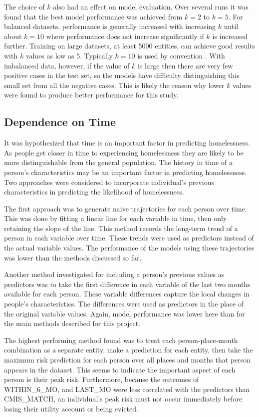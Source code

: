 \documentclass[10pt,letterpaper]{article}
\begin{document}
The choice of $k$ also had an effect on model evaluation. Over several runs it was found that the best model performance was achieved from $k=2$ to $k=5$. For balanced datasets, performance is generally increased with increasing $k$ until about $k=10$ where performance does not increase significantly if $k$ is increased further. Training on large datasets, at least 5000 entities, can achieve good results with $k$ values as low as 5. Typically $k=10$ is used by convention \cite{marcot2020optimal}. With imbalanced data, however, if the value of $k$ is large then there are very few positive cases in the test set, so the models have difficulty distinguishing this small set from all the negative cases. This is likely the reason why lower $k$ values were found to produce better performance for this study.

\subsection*{Dependence on Time}
It was hypothesized that time is an important factor in predicting homelessness. As people get closer in time to experiencing homelessness they are likely to be more distinguishable from the general population. The history in time of a person's characteristics may be an important factor in predicting homelessness. Two approaches were considered to incorporate individual's previous characteristics in predicting the likelihood of homelessness.

The first approach was to generate naive trajectories for each person over time. This was done by fitting a linear line for each variable in time, then only retaining the slope of the line. This method records the long-term trend of a person in each variable over time. These trends were used as predictors instead of the actual variable values. The performance of the models using these trajectories was lower than the methods discussed so far.

Another method investigated for including a person's previous values as predictors was to take the first difference in each variable of the last two months available for each person. These variable differences capture the local changes in people's characteristics. The differences were used as predictors in the place of the original variable values. Again, model performance was lower here than for the main methods described for this project.

The highest performing method found was to treat each person-place-month combination as a separate entity, make a prediction for each entity, then take the maximum risk prediction for each person over all places and months that person appears in the dataset. This seems to indicate the important aspect of each person is their peak risk. Furthermore, because the outcomes of WITHIN\_6\_MO, and LAST\_MO were less correlated with the predictors than CMIS\_MATCH, an individual's peak risk must not occur immediately before losing their utility account or being evicted. 
\end{document}
